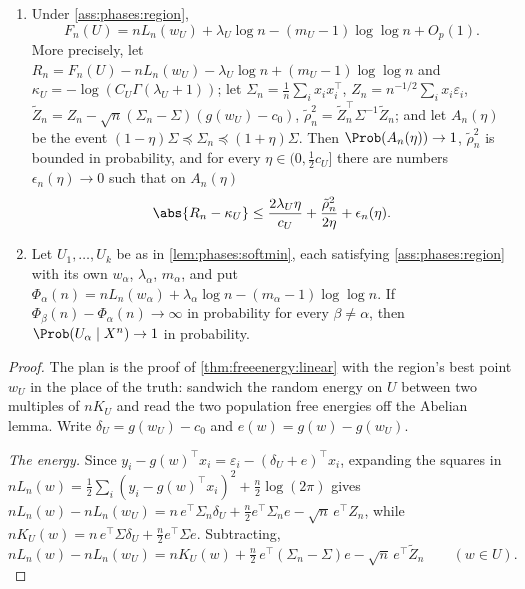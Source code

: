 \begin{refsection}
\begin{theorem}\label{thm:phases:local}
\begin{enumerate}[label=(\roman*)]
\item Under \cref{ass:phases:region},
\[
F_n(U)=nL_n(w_U)+\lambda_U\log n-(m_U-1)\log\log n+O_p(1).
\]
More precisely, let $R_n=F_n(U)-nL_n(w_U)-\lambda_U\log n+(m_U-1)\log\log n$ and $\kappa_U=-\log(C_U\Gamma(\lambda_U+1))$; let $\Sigma_n=\frac1n\sum_ix_ix_i^\top$, $Z_n=n^{-1/2}\sum_ix_i\varepsilon_i$, $\tilde Z_n=Z_n-\sqrt n(\Sigma_n-\Sigma)(g(w_U)-c_0)$, $\tilde\rho_n^2=\tilde Z_n^\top\Sigma^{-1}\tilde Z_n$; and let $A_n(\eta)$ be the event $(1-\eta)\Sigma\preceq\Sigma_n\preceq(1+\eta)\Sigma$. Then $\Prob(A_n(\eta))\to1$, $\tilde\rho_n^2$ is bounded in probability, and for every $\eta\in(0,\frac12c_U]$ there are numbers $\epsilon_n(\eta)\to0$ such that on $A_n(\eta)$
\begin{equation}\label{eq:phases:band}
\abs{R_n-\kappa_U}\le\frac{2\lambda_U\eta}{c_U}+\frac{\tilde\rho_n^2}{2\eta}+\epsilon_n(\eta).
\end{equation}
\item Let $U_1,\dots,U_k$ be as in \cref{lem:phases:softmin}, each satisfying \cref{ass:phases:region} with its own $w_\alpha$, $\lambda_\alpha$, $m_\alpha$, and put $\Phi_\alpha(n)=nL_n(w_\alpha)+\lambda_\alpha\log n-(m_\alpha-1)\log\log n$. If $\Phi_\beta(n)-\Phi_\alpha(n)\to\infty$ in probability for every $\beta\ne\alpha$, then $\Prob(U_\alpha\mid X^n)\to1$ in probability.
\end{enumerate}
\end{theorem}

\begin{proof}
The plan is the proof of \cref{thm:freeenergy:linear} with the region's best point $w_U$ in the place of the truth: sandwich the random energy on $U$ between two multiples of $nK_U$ and read the two population free energies off the Abelian lemma. Write $\delta_U=g(w_U)-c_0$ and $e(w)=g(w)-g(w_U)$.

\emph{The energy.} Since $y_i-g(w)^\top x_i=\varepsilon_i-(\delta_U+e)^\top x_i$, expanding the squares in $nL_n(w)=\frac12\sum_i(y_i-g(w)^\top x_i)^2+\frac n2\log(2\pi)$ gives $nL_n(w)-nL_n(w_U)=n\,e^\top\Sigma_n\delta_U+\frac n2e^\top\Sigma_ne-\sqrt n\,e^\top Z_n$, while $nK_U(w)=n\,e^\top\Sigma\delta_U+\frac n2e^\top\Sigma e$. Subtracting,
\begin{equation}\label{eq:phases:energy}
nL_n(w)-nL_n(w_U)=nK_U(w)+\tfrac n2\,e^\top(\Sigma_n-\Sigma)e-\sqrt n\,e^\top\tilde Z_n\qquad(w\in U).
\end{equation}


\end{proof}
\end{refsection}

